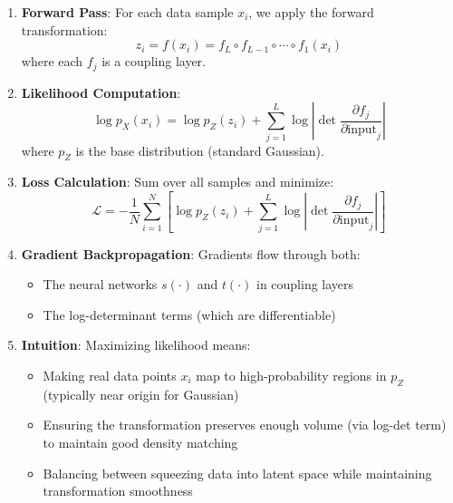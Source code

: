\documentclass[conference,12pt]{IEEEtran}
\begin{document}
\begin{enumerate}
    \item \textbf{Forward Pass}: For each data sample $x_i$, we apply the forward transformation:
    \begin{equation}
        z_i = f(x_i) = f_L \circ f_{L-1} \circ \cdots \circ f_1(x_i)
    \end{equation}
    where each $f_j$ is a coupling layer.
    
    \item \textbf{Likelihood Computation}:
    \begin{equation}
        \log p_X(x_i) = \log p_Z(z_i) + \sum_{j=1}^{L} \log \left|\det \frac{\partial f_j}{\partial \text{input}_j}\right|
    \end{equation}
    where $p_Z$ is the base distribution (standard Gaussian).
    
    \item \textbf{Loss Calculation}: Sum over all samples and minimize:
    \begin{equation}
        \mathcal{L} = -\frac{1}{N}\sum_{i=1}^{N} \left[\log p_Z(z_i) + \sum_{j=1}^{L} \log \left|\det \frac{\partial f_j}{\partial \text{input}_j}\right|\right]
    \end{equation}
    
    \item \textbf{Gradient Backpropagation}: Gradients flow through both:
    \begin{itemize}
        \item The neural networks $s(\cdot)$ and $t(\cdot)$ in coupling layers
        \item The log-determinant terms (which are differentiable)
    \end{itemize}
    
    \item \textbf{Intuition}: Maximizing likelihood means:
    \begin{itemize}
        \item Making real data points $x_i$ map to high-probability regions in $p_Z$ (typically near origin for Gaussian)
        \item Ensuring the transformation preserves enough volume (via log-det term) to maintain good density matching
        \item Balancing between squeezing data into latent space while maintaining transformation smoothness
    \end{itemize}
\end{enumerate}
\end{document}
